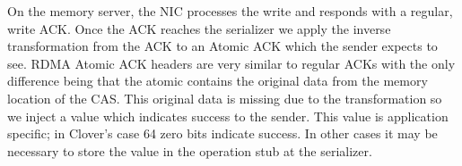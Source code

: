 On the memory server, the NIC processes the write and responds with a
regular, write ACK. Once the ACK reaches the serializer we apply the
inverse transformation from the ACK to an Atomic ACK which the sender
expects to see.  RDMA Atomic ACK headers are very similar to regular
ACKs with the only difference being that the atomic contains the
original data from the memory location of the CAS. This original data
is missing due to the transformation so we inject a value which
indicates success to the sender.
This value is application specific; in Clover's case 64 zero bits
indicate success.  In other cases it may be necessary to store the
value in the operation stub at the serializer.



